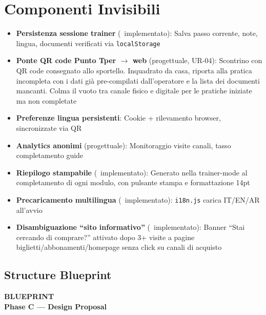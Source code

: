 ﻿\documentclass[11pt,a4paper]{article}
\begin{document}
\section{Componenti Invisibili}

\begin{tcolorbox}[rffield]
\small
\begin{itemize}[nosep]
  \item \textbf{Persistenza sessione trainer} (\checkmark\ implementato): Salva passo corrente, note, lingua, documenti verificati via \texttt{localStorage}
  \item \textbf{Ponte QR code Punto Tper $\rightarrow$ web} (progettuale, UR-04): Scontrino con QR code consegnato allo sportello. Inquadrato da casa, riporta alla pratica incompleta con i dati gi\`a pre-compilati dall'operatore e la lista dei documenti mancanti. Colma il vuoto tra canale fisico e digitale per le pratiche iniziate ma non completate
  \item \textbf{Preferenze lingua persistenti}: Cookie + rilevamento browser, sincronizzate via QR
  \item \textbf{Analytics anonimi} (progettuale): Monitoraggio visite canali, tasso completamento guide
  \item \textbf{Riepilogo stampabile} (\checkmark\ implementato): Generato nella trainer-mode al completamento di ogni modulo, con pulsante stampa e formattazione 14pt
  \item \textbf{Precaricamento multilingua} (\checkmark\ implementato): \texttt{i18n.js} carica IT/EN/AR all'avvio
  \item \textbf{Disambiguazione ``sito informativo''} (\checkmark\ implementato): Banner ``Stai cercando di comprare?'' attivato dopo 3+ visite a pagine biglietti/abbonamenti/homepage senza click su canali di acquisto
\end{itemize}
\end{tcolorbox}

\vspace{0.3cm}


\newpage

\subsection{Structure Blueprint}

\begin{tcolorbox}[headerbox]
 \color{white}\LARGE\bfseries\sffamily BLUEPRINT \\[0.1cm]
 \color{white!80}\small\sffamily Phase C --- Design Proposal
\end{tcolorbox}
\end{document}
